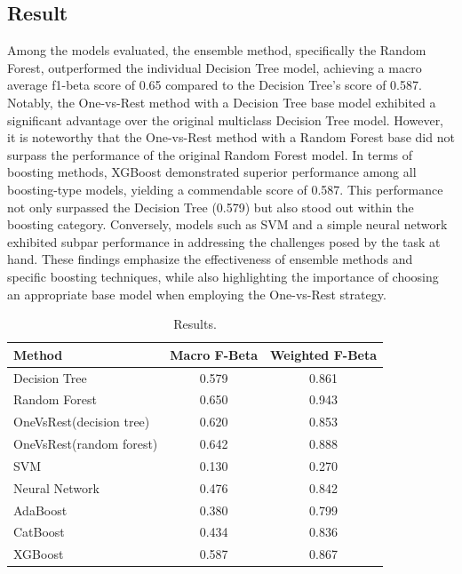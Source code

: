 \documentclass[10pt,twocolumn,letterpaper]{article}
\begin{document}
\begin{CJK}{UTF8}{bsmi}
\subsection{Result}
Among the models evaluated, the ensemble method, specifically the Random Forest, outperformed the individual Decision Tree model, achieving a macro average f1-beta score of 0.65 compared to the Decision Tree's score of 0.587. Notably, the One-vs-Rest method with a Decision Tree base model exhibited a significant advantage over the original multiclass Decision Tree model. However, it is noteworthy that the One-vs-Rest method with a Random Forest base did not surpass the performance of the original Random Forest model.
In terms of boosting methods, XGBoost demonstrated superior performance among all boosting-type models, yielding a commendable score of 0.587. This performance not only surpassed the Decision Tree (0.579) but also stood out within the boosting category. Conversely, models such as SVM and a simple neural network exhibited subpar performance in addressing the challenges posed by the task at hand. These findings emphasize the effectiveness of ensemble methods and specific boosting techniques, while also highlighting the importance of choosing an appropriate base model when employing the One-vs-Rest strategy.

\begin{table}
  \centering
  \begin{tabular}{@{}lc c@{}}
    \toprule
    Method & Macro F-Beta & Weighted F-Beta \\
    \midrule
    Decision Tree & 0.579 & 0.861 \\
    Random Forest & 0.650 & 0.943 \\
    OneVsRest(decision tree) & 0.620 & 0.853 \\
    OneVsRest(random forest) & 0.642 & 0.888 \\
    SVM & 0.130 & 0.270 \\
    Neural Network & 0.476 & 0.842 \\
    AdaBoost & 0.380 & 0.799 \\
    CatBoost & 0.434 & 0.836 \\
    XGBoost & 0.587 & 0.867 \\
    \bottomrule
  \end{tabular}
  \caption{Results.}
  \label{tab:example}
\end{table}


\end{CJK}
\end{document}
